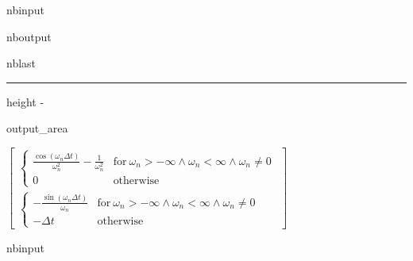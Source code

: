 \documentclass[letterpaper,10pt,english]{sphinxmanual}
\begin{document}
\begin{sphinxuseclass}{nbinput}
{
\begin{sphinxVerbatim}[commandchars=\\\{\}]
\llap{\color{nbsphinxin}[31]:\,\hspace{\fboxrule}\hspace{\fboxsep}}  
\end{sphinxVerbatim}
}

\end{sphinxuseclass}
\begin{sphinxuseclass}{nboutput}
\begin{sphinxuseclass}{nblast}
\hrule height -\fboxrule\relax
\vspace{\nbsphinxcodecellspacing}

\savebox\nbsphinxpromptbox[0pt][r]{\color{nbsphinxout}\Verb|\strut{[31]:}\,|}

\begin{nbsphinxfancyoutput}

\begin{sphinxuseclass}{output_area}
\begin{sphinxuseclass}{}$\displaystyle \left[\begin{matrix}\begin{cases} \frac{\cos{\left(\omega_{n} {\Delta}t \right)}}{\omega_{n}^{2}} - \frac{1}{\omega_{n}^{2}} & \text{for}\: \omega_{n} > -\infty \wedge \omega_{n} < \infty \wedge \omega_{n} \neq 0 \\0 & \text{otherwise} \end{cases}\\\begin{cases} - \frac{\sin{\left(\omega_{n} {\Delta}t \right)}}{\omega_{n}} & \text{for}\: \omega_{n} > -\infty \wedge \omega_{n} < \infty \wedge \omega_{n} \neq 0 \\- {\Delta}t & \text{otherwise} \end{cases}\end{matrix}\right]$
\end{sphinxuseclass}
\end{sphinxuseclass}
\end{nbsphinxfancyoutput}

\end{sphinxuseclass}
\end{sphinxuseclass}
\begin{sphinxuseclass}{nbinput}
{
\begin{sphinxVerbatim}[commandchars=\\\{\}]
\llap{\color{nbsphinxin}[32]:\,\hspace{\fboxrule}\hspace{\fboxsep}}
\end{sphinxVerbatim}
}

\end{sphinxuseclass}
\end{document}
